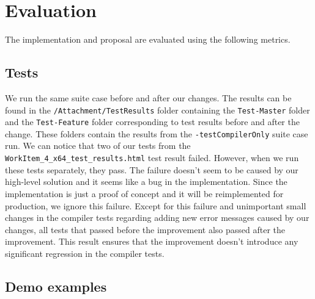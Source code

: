\chapter{Evaluation}

The implementation and proposal are evaluated using the following metrics.

\section{Tests}

We run the same suite case before and after our changes. 
The results can be found in the \texttt{/Attachment/TestResults} folder containing the \texttt{Test-Master} folder and the \texttt{Test-Feature} folder corresponding to test results before and after the change. 
These folders contain the results from the \texttt{-testCompilerOnly} suite case run.
We can notice that two of our tests from the \texttt{WorkItem\_4\_x64\_test\_results.html} test result failed.
However, when we run these tests separately, they pass.
The failure doesn't seem to be caused by our high-level solution and it seems like a bug in the implementation.
Since the implementation is just a proof of concept and it will be reimplemented for production, we ignore this failure.
Except for this failure and unimportant small changes in the compiler tests regarding adding new error messages caused by our changes, all tests that passed before the improvement also passed after the improvement.
This result ensures that the improvement doesn’t introduce any significant regression in the compiler tests.

\section{Demo examples}

